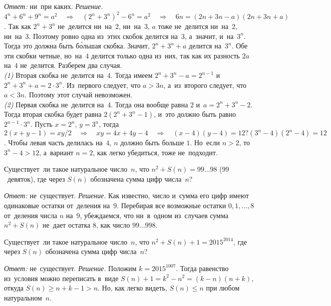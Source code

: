 \begin{problems}
 \textit{Ответ:} ни~при каких.
 \textit{Решение.}
 \(
     4^{n} + 6^{n} + 9^{n} = a^2
 \quad\Rightarrow\quad
     (2^{n} + 3^{n})^2 - 6^{n} = a^2
 \quad\Rightarrow\quad
     6 n = (2 n + 3 n - a) (2 n + 3 n + a)
 \).
 Так как $2^{n} + 3^{n}$ не~делится ни~на~$2$, ни~на~$3$, $a$ тоже не~делится
 ни~на~$2$, ни~на~$3$.
 Поэтому ровно одна из~этих скобок делится на~$3$, а~значит, и~на~$3^{n}$.
 Тогда это должна быть б\'{о}льшая скобка.
 Значит, $2^{n} + 3^{n} + a$ делится на~$3^{n}$.
 Обе эти скобки четные, но~на~$4$ делится только одна из~них, так как их
 разность $2 a$ на~$4$ не~делится.
 Разберем два случая.
 \\
 \textit{(1)}
 Вторая скобка не~делится на~$4$.
 Тогда имеем $2^{n} + 3^{n} - a = 2^{n-1}$
 и~$2^{n} + 3^{n} + a = 2 \cdot 3^{n}$.
 Из~первого следует, что $a > 3 n$, а~из~второго следует, что $a < 3 n$.
 Поэтому этот случай невозможен.
 \\
 \textit{(2)}
 Первая скобка не~делится на~$4$.
 Тогда она вообще равна $2$ и~$a = 2^{n} + 3^{n} - 2$.
 Тогда вторая скобка будет равна $2 (2^{n} + 3^{n} - 1)$, и~это должно быть
 равно $2^{n-1} \cdot 3^{n}$.
 Пусть $x = 2^{n}$, $y = 3^{n}$, тогда
 \(
     2 (x + y - 1) = x y / 2
 \quad\Rightarrow\quad
     x y = 4 x + 4 y - 4
 \quad\Rightarrow\quad
     (x - 4) (y - 4) = 12
     ?
     (3^{n} - 4) (2^{n} - 4) = 12
 \).
 Чтобы левая часть делилась на~$4$, $n$ должно быть больше $1$.
 Но~если $n > 2$, то~$3^{n} - 4 > 12$, а~вариант $n = 2$, как легко убедиться,
 тоже не~подходит.

Существует~ли такое натуральное число~$n$, что $n^2 + S(n) = 99{\ldots}98$
($99$~девяток), где через $S(n)$ обозначена сумма цифр числа~$n$? 

 \textit{Ответ:} не~существует.
 \textit{Решение.}
 Как известно, число и~сумма его цифр имеют одинаковые остатки от~деления
 на~$9$.
 Перебирая все возможные остатки $0, 1, \ldots, 8$ от~деления числа $n$ на~$9$,
 убеждаемся, что ни~в~одном из~случаев сумма $n^{2} + S(n)$ не~дает остатка 8,
 как число $99{\ldots}998$.

Существует~ли такое натуральное число~$n$, что $n^2 + S(n) + 1 = 2015^{2014}$,
где через $S(n)$ обозначена сумма цифр числа~$n$?

 \textit{Ответ:} не~существует.
 \textit{Решение.}
 Положим $k = 2015^{1007}$.
 Тогда равенство из~условия можно переписать в~виде
 $S(n) + 1 = k^{2} - n^{2} = (k - n) (n + k)$,
 откуда $S(n) \geq n + k - 1 > n$.
 Но, как легко видеть, $S(n) \leq n$ при любом натуральном~$n$.


\end{problems}
